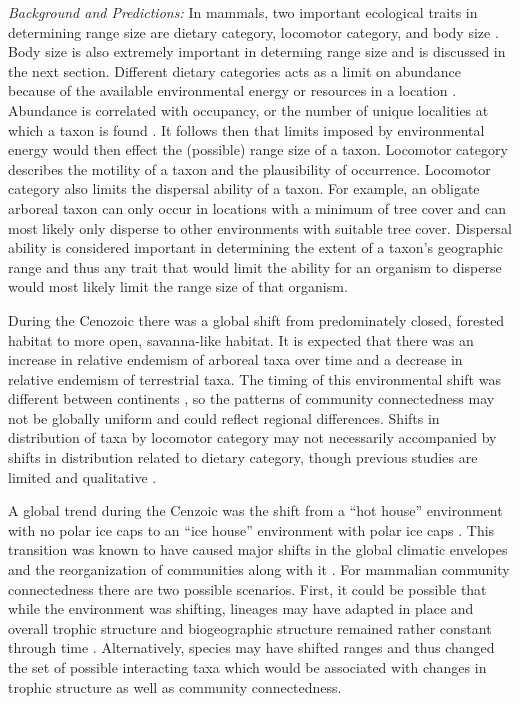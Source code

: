 \documentclass[12pt,letterpaper]{article}
\begin{document}
\textit{Background and Predictions:}
In mammals, two important ecological traits in determining range size are dietary category, locomotor category, and body size \citep{Jernvall2004,Lyons2005,Lyons2010}. Body size is also extremely important in determing range size \citep{Smith2008b,Smith2004,Damuth1981a} and is discussed in the next section. Different dietary categories acts as a limit on abundance because of the available environmental energy or resources in a location \citep{VanValen1989,Brown1987,Damuth1979,Silva1997,Janis2000}. Abundance is correlated with occupancy, or the number of unique localities at which a taxon is found \citep{Jernvall2002,Fortelius2002,Brown1984}. It follows then that limits imposed by environmental energy would then effect the (possible) range size of a taxon. Locomotor category describes the motility of a taxon and the plausibility of occurrence. Locomotor category also limits the dispersal ability of a taxon. For example, an obligate arboreal taxon can only occur in locations with a minimum of tree cover and can most likely only disperse to other environments with suitable tree cover. Dispersal ability is considered important in determining the extent of a taxon's geographic range \citep{Birand2012,Jablonski2006a,Gaston2009} and thus any trait that would limit the ability for an organism to disperse would most likely limit the range size of that organism.

During the Cenozoic there was a global shift from predominately closed, forested habitat to more open, savanna-like habitat. It is expected that there was an increase in relative endemism of arboreal taxa over time and a decrease in relative endemism of terrestrial taxa. The timing of this environmental shift was different between continents \citep{Stromberg2005,Stromberg2013}, so the patterns of community connectedness may not be globally uniform and could reflect regional differences. Shifts in distribution of taxa by locomotor category may not necessarily accompanied by shifts in distribution related to dietary category, though previous studies are limited and qualitative \citep{Janis1993a}. 

A global trend during the Cenzoic was the shift from a ``hot house'' environment with no polar ice caps to an ``ice house'' environment with polar ice caps \citep{Zachos2008,Zachos2001}. This transition was known to have caused major shifts in the global climatic envelopes and the reorganization of communities along with it \citep{Janis1993a,Fortelius2002,Blois2009,Alroy2000g,Figueirido2012}. For mammalian community connectedness there are two possible scenarios. First, it could be possible that while the environment was shifting, lineages may have adapted in place and overall trophic structure and biogeographic structure remained rather constant through time \citep{Jernvall2004}. Alternatively, species may have shifted ranges and thus changed the set of possible interacting taxa which would be associated with changes in trophic structure as well as community connectedness.
\end{document}
